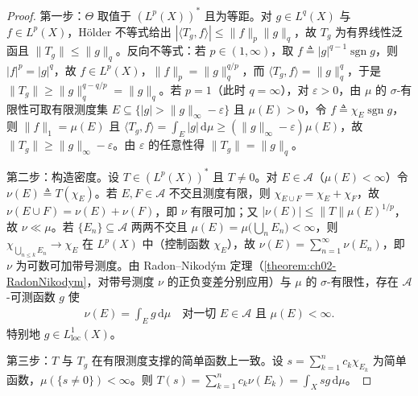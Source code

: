 \documentclass[../../main.tex]{subfiles}%
\begin{document}
\begin{proof}
第一步：$\Theta$ 取值于 $(L^p(X))^*$ 且为等距。对 $g\in L^q(X)$ 与 $f\in L^p(X)$，Hölder 不等式给出 $|\langle T_g,f\rangle|\leqslant\|f\|_p\|g\|_q$，故 $T_g$ 为有界线性泛函且 $\|T_g\|\leqslant\|g\|_q$。反向不等式：若 $p\in(1,\infty)$，取 $f\triangleq|g|^{q-1}\operatorname{sgn}g$，则 $|f|^p=|g|^q$，故 $f\in L^p(X)$，$\|f\|_p=\|g\|_q^{q/p}$，而 $\langle T_g,f\rangle=\|g\|_q^q$，于是 $\|T_g\|\geqslant\|g\|_q^{q-q/p}=\|g\|_q$。若 $p=1$（此时 $q=\infty$），对 $\varepsilon>0$，由 $\mu$ 的 $\sigma$-有限性可取有限测度集 $E\subseteq\{|g|>\|g\|_\infty-\varepsilon\}$ 且 $\mu(E)>0$，令 $f\triangleq\chi_E\operatorname{sgn}g$，则 $\|f\|_1=\mu(E)$ 且 $\langle T_g,f\rangle=\int_E|g|\,\mathrm{d}\mu\geqslant(\|g\|_\infty-\varepsilon)\mu(E)$，故 $\|T_g\|\geqslant\|g\|_\infty-\varepsilon$。由 $\varepsilon$ 的任意性得 $\|T_g\|=\|g\|_q$。

第二步：构造密度。设 $T\in(L^p(X))^*$ 且 $T\neq0$。对 $E\in\mathscr A$（$\mu(E)<\infty$）令 $\nu(E)\triangleq T(\chi_E)$。若 $E,F\in\mathscr A$ 不交且测度有限，则 $\chi_{E\cup F}=\chi_E+\chi_F$，故 $\nu(E\cup F)=\nu(E)+\nu(F)$，即 $\nu$ 有限可加；又 $|\nu(E)|\leqslant\|T\|\mu(E)^{1/p}$，故 $\nu\ll\mu$。若 $\{E_n\}\subseteq\mathscr A$ 两两不交且 $\mu(E)=\mu\bigl(\bigcup_nE_n\bigr)<\infty$，则 $\chi_{\bigcup_{n\leqslant k}E_n}\to\chi_E$ 在 $L^p(X)$ 中（控制函数 $\chi_E$），故 $\nu(E)=\sum_{n=1}^\infty\nu(E_n)$，即 $\nu$ 为可数可加带号测度。由 Radon--Nikodým 定理（\cref{theorem:ch02-RadonNikodym}，对带号测度 $\nu$ 的正负变差分别应用）与 $\mu$ 的 $\sigma$-有限性，存在 $\mathscr A$-可测函数 $g$ 使
\begin{align*}
\nu(E)=\int_Eg\,\mathrm{d}\mu\quad\text{对一切 }E\in\mathscr A\text{ 且 }\mu(E)<\infty.
\end{align*}
特别地 $g\in L^1_{\mathrm{loc}}(X)$。

第三步：$T$ 与 $T_g$ 在有限测度支撑的简单函数上一致。设 $s=\sum_{k=1}^nc_k\chi_{E_k}$ 为简单函数，$\mu(\{s\neq0\})<\infty$。则 $T(s)=\sum_{k=1}^nc_k\nu(E_k)=\int_Xsg\,\mathrm{d}\mu$。


\end{proof}
\end{document}
